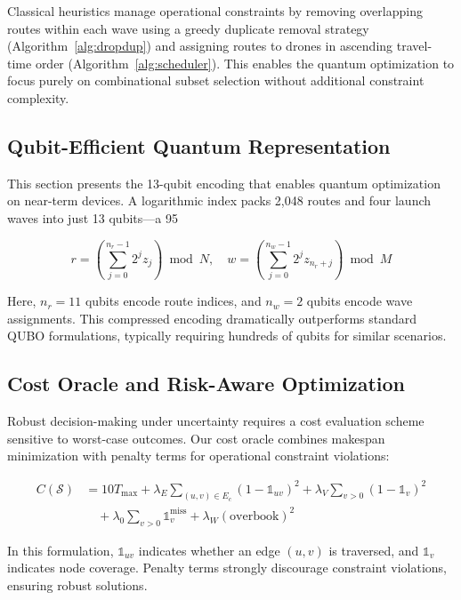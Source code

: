 Classical heuristics manage operational constraints by removing overlapping routes within each wave using a greedy duplicate removal strategy (Algorithm~\ref{alg:dropdup}) and assigning routes to drones in ascending travel-time order (Algorithm~\ref{alg:scheduler}). This enables the quantum optimization to focus purely on combinational subset selection without additional constraint complexity.

\subsection{Qubit-Efficient Quantum Representation}

This section presents the 13-qubit encoding that enables quantum optimization on near-term devices. A logarithmic index packs 2,048 routes and four launch waves into just 13 qubits—a 95%

\begin{equation}
r = \left(\sum_{j=0}^{n_r-1} 2^{j} z_j\right) \bmod N, \quad 
w = \left(\sum_{j=0}^{n_w-1} 2^{j} z_{n_r+j}\right) \bmod M
\label{eq:encoding}
\end{equation}

Here, $n_r=11$ qubits encode route indices, and $n_w=2$ qubits encode wave assignments. This compressed encoding dramatically outperforms standard QUBO formulations, typically requiring hundreds of qubits for similar scenarios.

\subsection{Cost Oracle and Risk-Aware Optimization}

Robust decision-making under uncertainty requires a cost evaluation scheme sensitive to worst-case outcomes. Our cost oracle combines makespan minimization with penalty terms for operational constraint violations:

\begin{equation}
\begin{split}
C(\mathcal{S}) &= 10 T_{\max} + \lambda_E \sum_{(u,v)\in E_c} (1-\mathbb{1}_{uv})^2 + \lambda_V \sum_{v>0}(1-\mathbb{1}_v)^2 \\
&\quad + \lambda_0 \sum_{v>0}\mathbb{1}_v^{\text{miss}} + \lambda_W (\text{overbook})^2
\end{split}
\label{eq:cost}
\end{equation}

In this formulation, $\mathbb{1}_{uv}$ indicates whether an edge $(u,v)$ is traversed, and $\mathbb{1}_v$ indicates node coverage. Penalty terms strongly discourage constraint violations, ensuring robust solutions.

